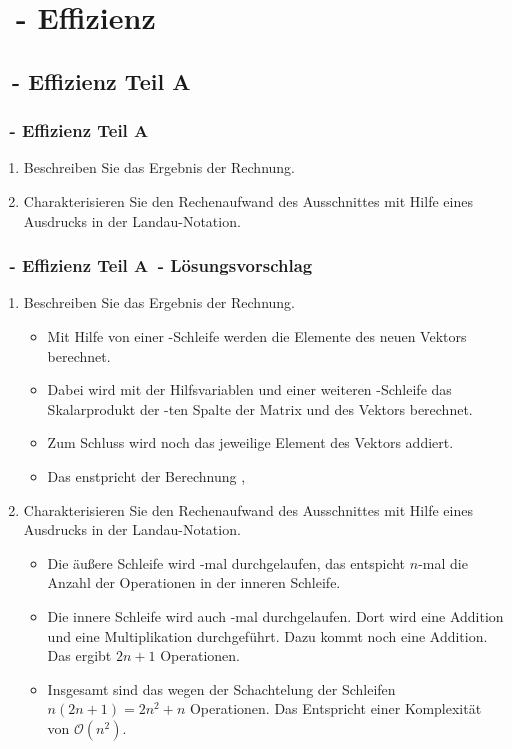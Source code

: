 \def\stitle{\theexercise\ - Effizienz}
\def\sAtitle{\theexercise\ - Effizienz Teil A}
\def\sBtitle{\theexercise\ - Effizienz Teil B}
\section{\stitle}
\subsection{\sAtitle}
\begin{frame}%
  \frametitle{\sAtitle}%

\begin{enumerate}
\item Beschreiben Sie das Ergebnis der Rechnung.
\item Charakterisieren Sie den Rechenaufwand des Ausschnittes mit Hilfe eines Ausdrucks in der Landau-Notation.
\end{enumerate}


\end{frame}

\begin{frame}%
  \frametitle{\sAtitle\ - L\"osungsvorschlag}%
\medskip

\begin{enumerate}
  \item Beschreiben Sie das Ergebnis der Rechnung.
  \begin{itemize}
    \item Mit Hilfe von einer -Schleife werden die Elemente des neuen Vektors  berechnet.
    \item Dabei wird mit der Hilfsvariablen  und einer weiteren -Schleife das Skalarprodukt der -ten Spalte der Matrix  und des Vektors  berechnet.
    \item Zum Schluss wird noch das jeweilige Element des Vektors  addiert.
    \item Das enstpricht der Berechnung ,
  \end{itemize}
  \item Charakterisieren Sie den Rechenaufwand des Ausschnittes mit Hilfe eines Ausdrucks in der Landau-Notation.
  \begin{itemize}
  \item Die \"au\ss ere Schleife wird -mal durchgelaufen, das entspicht $n$-mal die Anzahl der Operationen in der inneren Schleife.
  \item Die innere Schleife wird auch -mal durchgelaufen.
  Dort wird eine Addition und eine  Multiplikation durchgef\"uhrt.
  Dazu kommt noch eine Addition.
  Das ergibt $2n+1$ Operationen.
  \item Insgesamt sind  das wegen der Schachtelung der Schleifen $n(2n+1)=2n^2+n$ Operationen.
  Das Entspricht einer Komplexit\"at von $\mathcal{O}(n^2)$.
  \end{itemize}
\end{enumerate}
\end{frame}


